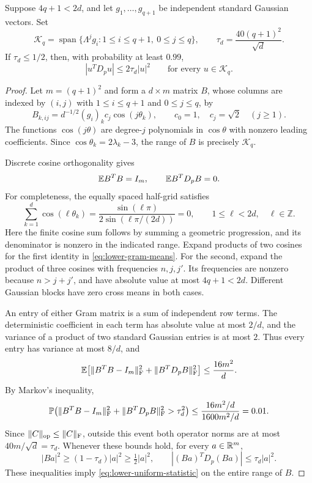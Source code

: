 \begin{lemma}\label{lem:lower-span-statistic}
Suppose $4q+1<2d$, and let $g_1,\ldots,g_{q+1}$ be independent standard
Gaussian vectors. Set
\[
 \mathcal K_q=\operatorname{span}
 \{\Lambda^j g_i:1\le i\le q+1,\ 0\le j\le q\},\qquad
 \tau_d=\frac{40(q+1)^2}{\sqrt d}.
\]
If $\tau_d\le1/2$, then, with probability at least $0.99$,
\begin{equation}\label{eq:lower-uniform-statistic}
 |u^TD_pu|\le2\tau_d|u|^2
 \qquad\text{for every }u\in\mathcal K_q.
\end{equation}
\end{lemma}

\begin{proof}
Let $m=(q+1)^2$ and form a $d\times m$ matrix $B$, whose columns are
indexed by $(i,j)$ with $1\le i\le q+1$ and $0\le j\le q$, by
\[
 B_{k,ij}=d^{-1/2}(g_i)_k c_j\cos(j\theta_k),
 \qquad c_0=1,\quad c_j=\sqrt2\quad(j\ge1).
\]
The functions $\cos(j\theta)$ are degree-$j$ polynomials in
$\cos\theta$ with nonzero leading coefficients. Since
$\cos\theta_k=2\lambda_k-3$, the range of $B$ is precisely
$\mathcal K_q$.

Discrete cosine orthogonality gives
\begin{equation}\label{eq:lower-gram-means}
                  \mathbb E B^TB=I_m,\qquad \mathbb E B^TD_pB=0.
\end{equation}
For completeness, the equally spaced half-grid satisfies
\begin{equation}\label{eq:lower-cosine-sum}
 \sum_{k=1}^d\cos(\ell\theta_k)
 =\frac{\sin(\ell\pi)}{2\sin(\ell\pi/(2d))}=0,
 \qquad 1\le\ell<2d,\quad \ell\in\mathbb Z.
\end{equation}
Here the finite cosine sum follows by summing a geometric progression,
and its denominator is nonzero in the indicated range.
Expand products of two cosines for the first identity in
\eqref{eq:lower-gram-means}. For the second, expand the product of
three cosines with frequencies $n,j,j'$. Its frequencies are nonzero
because $n>j+j'$, and have absolute value at most $4q+1<2d$.
Different Gaussian blocks have zero cross means in both cases.

An entry of either Gram matrix is a sum of independent row terms.
The deterministic coefficient in each term has absolute value at most
$2/d$, and the variance of a product of two standard Gaussian entries
is at most $2$. Thus every entry has variance at most $8/d$, and
\[
 \mathbb E\bigl[\|B^TB-I_m\|_{\mathrm F}^2+
               \|B^TD_pB\|_{\mathrm F}^2\bigr]
 \le\frac{16m^2}{d}.
\]
By Markov's inequality,
\[
 \mathbb P\!\left(\|B^TB-I_m\|_{\mathrm F}^2+
                 \|B^TD_pB\|_{\mathrm F}^2>\tau_d^2\right)
 \le\frac{16m^2/d}{1600m^2/d}=0.01.
\]
Since $\|C\|_{\mathrm{op}}\le\|C\|_{\mathrm F}$, outside this event both operator
norms are at most $40m/\sqrt d=\tau_d$. Whenever these bounds hold, for every
$a\in\mathbb R^m$,
\[
 |Ba|^2\ge(1-\tau_d)|a|^2\ge\tfrac12|a|^2,
 \qquad |(Ba)^TD_p(Ba)|\le\tau_d|a|^2.
\]
These inequalities imply \eqref{eq:lower-uniform-statistic} on the
entire range of $B$.
\end{proof}

